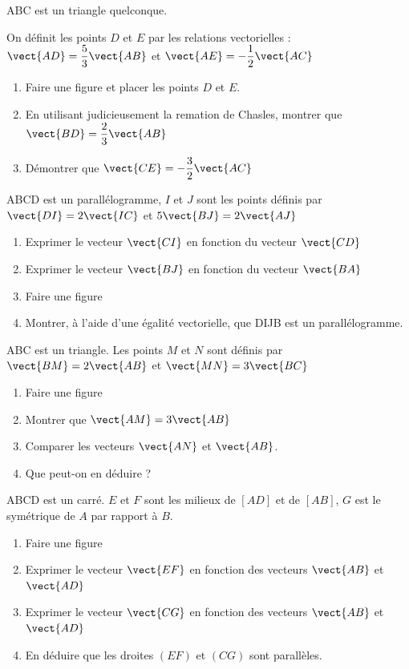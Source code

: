 \exo 

ABC est un triangle quelconque.

On définit les points $D$ et $E$ par les relations vectorielles : $\vect{AD}=\dfrac{5}{3} \vect{AB}$ et $\vect{AE}=-\dfrac{1}{2}\vect{AC}$

\begin{enumerate}
\item Faire une figure et placer les points $D$ et $E$. 
\item En utilisant judicieusement la remation de Chasles, montrer que $\vect{BD}=\dfrac{2}{3}\vect{AB}$
\item Démontrer que $\vect{CE}=-\dfrac{3}{2}\vect{AC}$
\end{enumerate}

\vspace{1cm}

\exo

ABCD est un parallélogramme, $I$ et $J$ sont les points définis par $\vect{DI}=2 \vect{IC}$ et $5 \vect{BJ} = 2 \vect{AJ}$

\begin{enumerate}
\item Exprimer le vecteur $\vect{CI}$ en fonction du vecteur $\vect{CD}$ 
\item Exprimer le vecteur $\vect{BJ}$ en fonction du vecteur $\vect{BA}$
\item Faire une figure
\item Montrer, à l'aide d'une égalité vectorielle, que DIJB est un parallélogramme.
\end{enumerate}

\vspace{1cm}

\exo

ABC est un triangle. Les points $M$ et $N$ sont définis par $\vect{BM}=2 \vect{AB}$ et $\vect{MN}= 3 \vect{BC}$

\begin{enumerate}
\item Faire une figure
\item Montrer que $\vect{AM} = 3 \vect{AB}$
\item Comparer les vecteurs $\vect{AN}$ et $\vect{AB}$.
\item Que peut-on en déduire ?
\end{enumerate}

\vspace{1cm}

\exo 

ABCD est un carré. $E$ et $F$ sont les milieux de $[AD]$ et de $[AB]$, $G$ est le symétrique de $A$ par rapport à $B$.

\begin{enumerate}
\item Faire une figure
\item Exprimer le vecteur $\vect{EF}$ en fonction des vecteurs $\vect{AB}$ et $\vect{AD}$
\item Exprimer le vecteur $\vect{CG}$ en fonction des vecteurs $\vect{AB}$ et $\vect{AD}$
\item En déduire que les droites $(EF)$ et $(CG)$ sont parallèles.
\end{enumerate}


